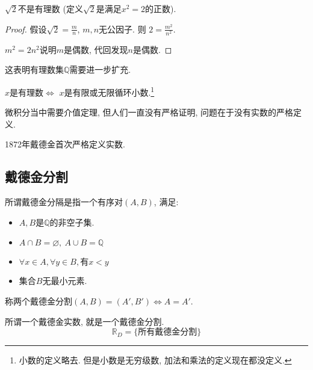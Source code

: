 \begin{proposition}
    $\sqrt{2}$不是有理数 (定义$\sqrt{2}$是满足$x^2 = 2$的正数).
\end{proposition}
\begin{proof}
    假设$\sqrt{2} = \frac{m}{n}$, $m,n$无公因子. 则 $2 = \frac{m^2}{n^2}.$

    $m^2 = 2 n^2$说明$m$是偶数, 代回发现$n$是偶数.
\end{proof}

这表明有理数集$\mathbb{Q}$需要进一步扩充.

\begin{proposition}
    $x$是有理数$\iff$ $x$是有限或无限循环小数.\footnote{小数的定义略去. 但是小数是无穷级数, 加法和乘法的定义现在都没定义.}
\end{proposition}

微积分当中需要介值定理, 但人们一直没有严格证明, 问题在于没有实数的严格定义.

1872年戴德金首次严格定义实数.

\subsection{戴德金分割}

\begin{definition}
    所谓戴德金分隔是指一个有序对$(A,B)$, 满足:
    \begin{itemize}
        \item $A,B$是$\mathbb{Q}$的非空子集.
        \item $A \cap B = \varnothing, \ A \cup B = \mathbb{Q}$
        \item $\forall x\in A, \forall y\in B, \text{有} x< y$
        \item 集合$B$无最小元素.
    \end{itemize}

    称两个戴德金分割$(A,B) = (A',B') \iff A = A'$.
\end{definition}

\begin{definition}
    所谓一个戴德金实数, 就是一个戴德金分割.
    \begin{equation}
      \mathbb{R}_{D} = \{\text{所有戴德金分割}\}
    \end{equation}
\end{definition}

